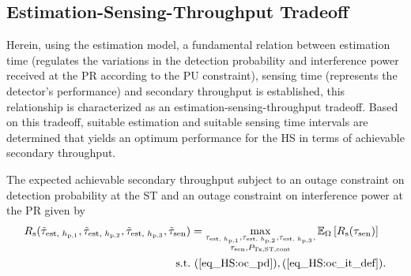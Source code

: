 \subsection{Estimation-Sensing-Throughput Tradeoff}
Herein, using the estimation model, a fundamental relation between estimation time (regulates the variations in the detection probability and interference power received at the PR according to the PU constraint), sensing time (represents the detector's performance) and secondary throughput is established, this relationship is characterized as an estimation-sensing-throughput tradeoff. Based on this tradeoff, suitable estimation and suitable sensing time intervals are determined that yields an optimum performance for the HS in terms of achievable secondary throughput. 
\begin{theorem} \label{th_HS:th1}
\normalfont
The expected achievable secondary throughput subject to an outage constraint on detection probability at the ST and an outage constraint on interference power at the PR given by
\begin{align}
R_{\text{s}}(\tilde{\tau}_{\text{est, $h_{\text{p,1}}$}}, \tilde{\tau}_{\text{est, $h_{\text{p,2}}$}}, \tilde{\tau}_{\text{est, $h_{\text{p,3}}$}}, \tilde{\tau}_{\text{sen}}) &= \operatorname*{max}_{\substack{\tau_{\text{est, $h_{\text{p,1}}$}}, \tau_{\text{est, $h_{\text{p,2}}$}}, \tau_{\text{est, $h_{\text{p,3}}$}}, \\ \tau_{\text{sen}}, P_{\text{Tx,ST,cont}}}} {\mathbb E}_{\Omega}\left[ R_{\text{s}}(\tau_{\text{sen}}) \right] \label{eq_HS:opT_em}\\
\text{s.t.} & \text{ } (\ref{eq_HS:oc_pd}), (\ref{eq_HS:oc_it_def}). \nonumber 
\end{align}
\end{theorem}
